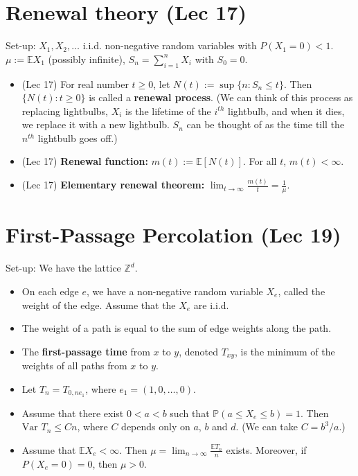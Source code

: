 \documentclass[twoside]{article}
\newcommand{\dis}{\displaystyle}
\newcommand\bbE{\mathbb{E}}
\newcommand\bbP{\mathbb{P}}
\newcommand\bbZ{\mathbb{Z}}
\newcommand\goesto{\rightarrow}
\newcommand\var{\text{Var }}
\begin{document}
\section*{Renewal theory (Lec 17)}
Set-up: $X_1, X_2, \dots$ i.i.d. non-negative random variables with $P(X_1 = 0) < 1$. $\mu := \bbE X_1$ (possibly infinite), $S_n = \dis\sum_{i=1}^n X_i$ with $S_0 = 0$.

\begin{itemize}
\item (Lec 17) For real number $t \geq 0$, let $N(t) := \sup \{ n: S_n \leq t \}$. Then $\{ N(t): t \geq 0 \}$ is called a \textbf{renewal process}. (We can think of this process as replacing lightbulbs, $X_i$ is the lifetime of the $i^{th}$ lightbulb, and when it dies, we replace it with a new lightbulb. $S_n$ can be thought of as the time till the $n^{th}$ lightbulb goes off.)

\item (Lec 17) \textbf{Renewal function:} $m(t) := \bbE[N(t)]$. For all $t$, $m(t) < \infty$.

\item (Lec 17) \textbf{Elementary renewal theorem:} $\dis\lim_{t \goesto \infty} \frac{m(t)}{t} = \frac{1}{\mu}.$

\end{itemize}

\section*{First-Passage Percolation (Lec 19)}
Set-up: We have the lattice $\bbZ^d$.
\begin{itemize}
\item On each edge $e$, we have a non-negative random variable $X_e$, called the weight of the edge. Assume that the $X_e$ are i.i.d.
\item The weight of a path is equal to the sum of edge weights along the path.
\item The \textbf{first-passage time} from $x$ to $y$, denoted $T_{xy}$, is the minimum of the weights of all paths from $x$ to $y$.
\item Let $T_n = T_{0, ne_1}$, where $e_1 = (1,0, \dots, 0)$.
\end{itemize}

\begin{itemize}
\item Assume that there exist $0 < a < b$ such that $\bbP(a \leq X_e \leq b) = 1$. Then $\var T_n \leq Cn$, where $C$ depends only on $a$, $b$ and $d$. (We can take $C = b^3/a$.)

\item Assume that $\bbE X_e < \infty$. Then $\mu = \dis\lim_{n \rightarrow \infty} \frac{\bbE T_n}{n}$ exists. Moreover, if $P(X_e = 0) = 0$, then $\mu > 0$.

\end{itemize}
\end{document}
